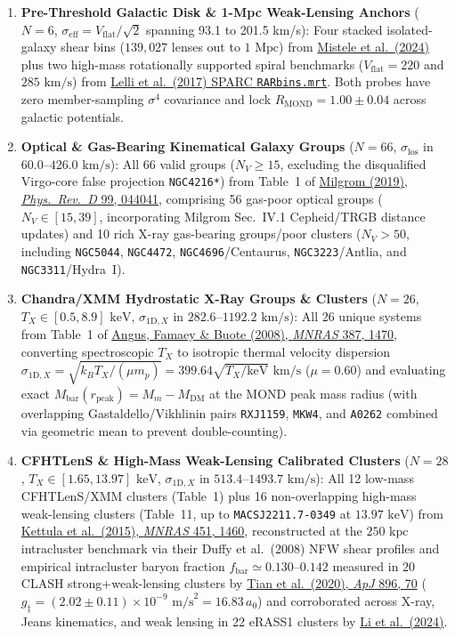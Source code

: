 \documentclass[11pt,a4paper]{article}
\begin{document}
\begin{enumerate}\sloppy\setlength{\itemsep}{2pt}
  \item \textbf{Pre-Threshold Galactic Disk \& 1-Mpc Weak-Lensing Anchors} ($N=6$, $\sigma_{\mathrm{eff}} = V_{\mathrm{flat}}/\sqrt{2}$ spanning 93.1 to 201.5 km/s): Four stacked isolated-galaxy shear bins ($139{,}027$ lenses out to $1\text{ Mpc}$) from \href{https://arxiv.org/html/2406.09685v1}{Mistele et al.\ (2024)} plus two high-mass rotationally supported spiral benchmarks ($V_{\mathrm{flat}} = 220$ and $285\text{ km/s}$) from \href{https://astroweb.cwru.edu/SPARC/RARbins.mrt}{Lelli et al.\ (2017) SPARC \texttt{RARbins.mrt}}. Both probes have zero member-sampling $\sigma^4$ covariance and lock $R_{\mathrm{MOND}} = 1.00 \pm 0.04$ across galactic potentials.
  \item \textbf{Optical \& Gas-Bearing Kinematical Galaxy Groups} ($N=66$, $\sigma_{\mathrm{los}}$ in $60.0\text{--}426.0\text{ km/s}$): All 66 valid groups ($N_V \ge 15$, excluding the disqualified Virgo-core false projection \texttt{NGC4216*}) from Table~1 of \href{https://arxiv.org/html/1811.12233v2}{Milgrom (2019), \textit{Phys.\ Rev.\ D} 99, 044041}, comprising 56 gas-poor optical groups ($N_V \in [15,39]$, incorporating Milgrom Sec.~IV.1 Cepheid/TRGB distance updates) and 10 rich X-ray gas-bearing groups/poor clusters ($N_V > 50$, including \texttt{NGC5044}, \texttt{NGC4472}, \texttt{NGC4696}/Centaurus, \texttt{NGC3223}/Antlia, and \texttt{NGC3311}/Hydra~I).
  \item \textbf{Chandra/XMM Hydrostatic X-Ray Groups \& Clusters} ($N=26$, $T_X \in [0.5, 8.9]\text{ keV}$, $\sigma_{\mathrm{1D},X}$ in $282.6\text{--}1192.2\text{ km/s}$): All 26 unique systems from Table~1 of \href{https://arxiv.org/html/0709.0108v3}{Angus, Famaey \& Buote (2008), \textit{MNRAS} 387, 1470}, converting spectroscopic $T_X$ to isotropic thermal velocity dispersion $\sigma_{\mathrm{1D},X} = \sqrt{k_B T_X / (\mu m_p)} = 399.64\sqrt{T_X/\mathrm{keV}}\text{ km/s}$ ($\mu = 0.60$) and evaluating exact $M_{\mathrm{bar}}(r_{\mathrm{peak}}) = M_m - M_{\mathrm{DM}}$ at the MOND peak mass radius (with overlapping Gastaldello/Vikhlinin pairs \texttt{RXJ1159}, \texttt{MKW4}, and \texttt{A0262} combined via geometric mean to prevent double-counting).
  \item \textbf{CFHTLenS \& High-Mass Weak-Lensing Calibrated Clusters} ($N=28$, $T_X \in [1.65, 13.97]\text{ keV}$, $\sigma_{\mathrm{1D},X}$ in $513.4\text{--}1493.7\text{ km/s}$): All 12 low-mass CFHTLenS/XMM clusters (Table~1) plus 16 non-overlapping high-mass weak-lensing clusters (Table~11, up to \texttt{MACSJ2211.7-0349} at $13.97\text{ keV}$) from \href{https://arxiv.org/html/1410.8769v2}{Kettula et al.\ (2015), \textit{MNRAS} 451, 1460}, reconstructed at the $250\text{ kpc}$ intracluster benchmark via their Duffy et al.\ (2008) NFW shear profiles and empirical intracluster baryon fraction $f_{\mathrm{bar}} \simeq 0.130\text{--}0.142$ measured in 20 CLASH strong+weak-lensing clusters by \href{https://arxiv.org/html/2001.08340v2}{Tian et al.\ (2020), \textit{ApJ} 896, 70} ($g_{\ddagger} = (2.02 \pm 0.11)\times 10^{-9}\text{ m/s}^2 = 16.83\,a_0$) and corroborated across X-ray, Jeans kinematics, and weak lensing in 22 eRASS1 clusters by \href{https://arxiv.org/html/2411.09735v1}{Li et al.\ (2024)}.

\end{enumerate}
\end{document}
